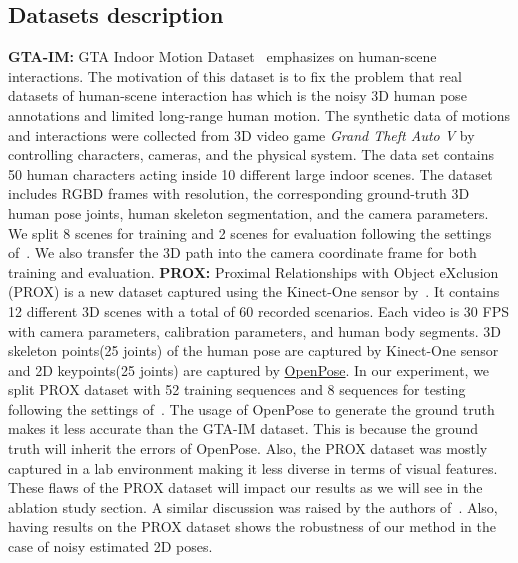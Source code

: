 \documentclass[10pt,twocolumn,letterpaper]{article}
\begin{document}
\subsection{Datasets description}
\noindent \textbf{GTA-IM:} GTA Indoor Motion Dataset~\cite{cao2020long} emphasizes on human-scene interactions. The motivation of this dataset is to fix the problem that real datasets of human-scene interaction has which is the noisy 3D human pose annotations and limited long-range human motion. The synthetic data of motions and interactions were collected from 3D video game \emph{Grand Theft Auto V} by controlling characters, cameras, and the physical system. The data set contains 50 human characters acting inside 10 different large indoor scenes. The dataset includes RGBD frames with  resolution, the corresponding ground-truth 3D human pose joints, human skeleton segmentation, and the camera parameters. We split 8 scenes for training and 2 scenes for evaluation following the settings of~\cite{cao2020long}. We also transfer the 3D path into the camera coordinate frame for both training and evaluation.
\noindent \textbf{PROX:} Proximal Relationships with Object eXclusion (PROX) is a new dataset captured using the Kinect-One sensor by~\cite{hassan2019resolving}. It contains 12 different 3D scenes with a total of 60 recorded scenarios. Each video is 30 FPS with camera parameters, calibration parameters, and human body segments. 3D skeleton points(25 joints) of the human pose are captured by Kinect-One sensor and 2D keypoints(25 joints) are captured by \href{https://github.com/CMU-Perceptual-Computing-Lab/openpose}{OpenPose}. In our experiment, we split PROX dataset with 52 training sequences and 8 sequences for testing following the settings of~\cite{cao2020long}. The usage of OpenPose to generate the ground truth makes it less accurate than the GTA-IM dataset. This is because the ground truth will inherit the errors of OpenPose. Also, the PROX dataset was mostly captured in a lab environment making it less diverse in terms of visual features. These flaws of the PROX dataset will impact our results as we will see in the ablation study section. A similar discussion was raised by the authors of~\cite{cao2020long}. Also, having results on the PROX dataset shows the robustness of our method in the case of noisy estimated 2D poses.
\end{document}
